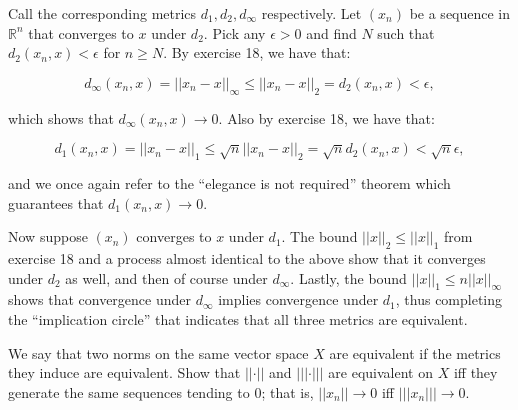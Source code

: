 \begin{solution}
    
    Call the corresponding metrics $d_1, d_2, d_{\infty}$ respectively.
    Let $(x_n)$ be a sequence in $\mathbb{R}^n$ that converges to $x$ under $d_2$.
    Pick any $\epsilon > 0$ and find $N$ such that $d_2(x_n, x) < \epsilon$ for $n \geq N$.
    By exercise 18, we have that:

    $$d_{\infty}(x_n, x) = \lvert \lvert x_n - x \rvert \rvert_{\infty} \leq \lvert \lvert x_n - x \rvert \rvert_2 = d_2(x_n, x) < \epsilon,$$

    which shows that $d_{\infty}(x_n, x) \rightarrow 0$.
    Also by exercise 18, we have that:

    $$d_1(x_n, x) = \lvert \lvert x_n - x \rvert \rvert_1 \leq \sqrt{n} \lvert \lvert x_n - x \rvert \rvert_2 = \sqrt{n} d_2(x_n, x) < \sqrt{n} \epsilon,$$

    and we once again refer to the ``elegance is not required'' theorem which guarantees that $d_1(x_n, x) \rightarrow 0$.

    Now suppose $(x_n)$ converges to $x$ under $d_1$.
    The bound $\lvert \lvert x \rvert \rvert_2 \leq \lvert \lvert x \rvert \rvert_1$ from exercise 18 and a process almost identical to the above show that it converges under $d_2$ as well, and then of course under $d_{\infty}$.
    Lastly, the bound $\lvert \lvert x \rvert \rvert_1 \leq n \lvert \lvert x \rvert \rvert_{\infty}$ shows that convergence under $d_{\infty}$ implies convergence under $d_1$, thus completing the ``implication circle'' that indicates that all three metrics are equivalent.
\end{solution}

\begin{exercise}{45}
    We say that two norms on the same vector space $X$ are equivalent if the metrics they induce are equivalent.
    Show that $\lvert \lvert \cdot \rvert \rvert$ and $\lvert \lvert \lvert \cdot \rvert \rvert \rvert$ are equivalent on $X$ iff they generate the same sequences tending to 0; that is, $\lvert \lvert x_n \rvert \rvert \rightarrow 0$ iff $\lvert \lvert \lvert x_n \rvert \rvert \rvert \rightarrow 0$.
\end{exercise}

